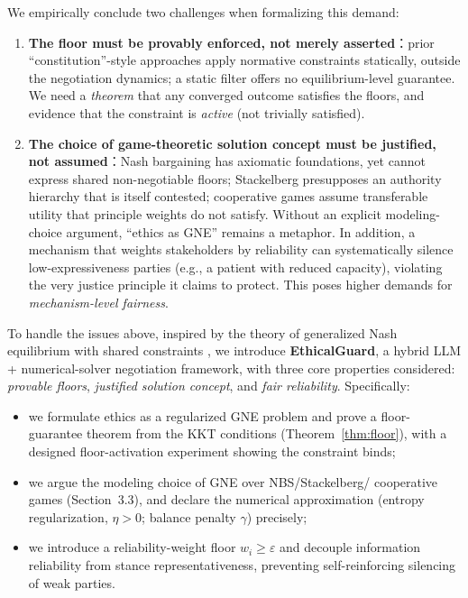\documentclass[11pt]{article}
\begin{document}
We empirically conclude two challenges when formalizing this demand:
\begin{enumerate}[label=(\Roman*)]
  \item \textbf{The floor must be provably enforced, not merely
  asserted}：prior ``constitution''-style approaches \cite{superego2025,
  governance2025} apply normative constraints statically, outside the
  negotiation dynamics; a static filter offers no equilibrium-level guarantee.
  We need a \emph{theorem} that any converged outcome satisfies the floors,
  and evidence that the constraint is \emph{active} (not trivially satisfied).
  \item \textbf{The choice of game-theoretic solution concept must be
  justified, not assumed}：Nash bargaining has axiomatic foundations, yet
  cannot express shared non-negotiable floors; Stackelberg presupposes an
  authority hierarchy that is itself contested; cooperative games assume
  transferable utility that principle weights do not satisfy. Without an
  explicit modeling-choice argument, ``ethics as GNE'' remains a metaphor.
  In addition, a mechanism that weights stakeholders by reliability can
  systematically silence low-expressiveness parties (e.g., a patient with
  reduced capacity), violating the very justice principle it claims to
  protect. This poses higher demands for \emph{mechanism-level fairness}.
\end{enumerate}

To handle the issues above, inspired by the theory of generalized Nash
equilibrium with shared constraints \cite{facchinei2010,shared2017}, we
introduce \textbf{EthicalGuard}, a hybrid LLM + numerical-solver negotiation
framework, with three core properties considered: \emph{provable floors},
\emph{justified solution concept}, and \emph{fair reliability}. Specifically:
\begin{itemize}
  \item[(i)] we formulate ethics as a regularized GNE problem and prove a
  floor-guarantee theorem from the KKT conditions (Theorem~\ref{thm:floor}),
  with a designed floor-activation experiment showing the constraint binds;
  \item[(ii)] we argue the modeling choice of GNE over NBS/Stackelberg/
  cooperative games (Section~3.3), and declare the numerical approximation
  (entropy regularization, $\eta>0$; balance penalty $\gamma$) precisely;
  \item[(iii)] we introduce a reliability-weight floor
  $w_i\ge\varepsilon$ and decouple information reliability from stance
  representativeness, preventing self-reinforcing silencing of weak parties.
\end{itemize}
\end{document}
